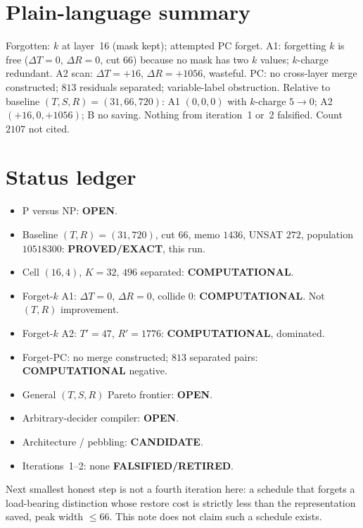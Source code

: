 \documentclass[11pt]{article}
\begin{document}
\section{Plain-language summary}
Forgotten: \(k\) at layer~16 (mask kept); attempted PC forget.
A1: forgetting \(k\) is free (\(\Delta T=0\), \(\Delta R=0\), cut \(66\)) because no mask has two \(k\) values; \(k\)-charge redundant.
A2 scan: \(\Delta T=+16\), \(\Delta R=+1056\), wasteful.
PC: no cross-layer merge constructed; \(813\) residuals separated; variable-label obstruction.
Relative to baseline \((T,S,R)=(31,66,720)\): A1 \((0,0,0)\) with \(k\)-charge \(5\to0\); A2 \((+16,0,+1056)\); B no saving.
Nothing from iteration~1 or~2 falsified. Count \(2107\) not cited.

\section{Status ledger}
\begin{itemize}
\item P versus NP: \textbf{OPEN}.
\item Baseline \((T,R)=(31,720)\), cut \(66\), memo \(1436\), UNSAT \(272\), population \(10518300\): \textbf{PROVED/EXACT}, this run.
\item Cell \((16,4)\), \(K=32\), \(496\) separated: \textbf{COMPUTATIONAL}.
\item Forget-\(k\) A1: \(\Delta T=0\), \(\Delta R=0\), collide \(0\): \textbf{COMPUTATIONAL}. Not \((T,R)\) improvement.
\item Forget-\(k\) A2: \(T'=47\), \(R'=1776\): \textbf{COMPUTATIONAL}, dominated.
\item Forget-PC: no merge constructed; \(813\) separated pairs: \textbf{COMPUTATIONAL} negative.
\item General \((T,S,R)\) Pareto frontier: \textbf{OPEN}.
\item Arbitrary-decider compiler: \textbf{OPEN}.
\item Architecture / pebbling: \textbf{CANDIDATE}.
\item Iterations~1--2: none \textbf{FALSIFIED/RETIRED}.
\end{itemize}

Next smallest honest step is not a fourth iteration here: a schedule that forgets a load-bearing distinction whose restore cost is strictly less than the representation saved, peak width \(\le 66\). This note does not claim such a schedule exists.

\end{document}
